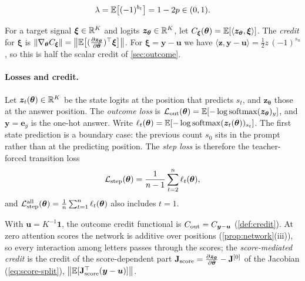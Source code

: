 \begin{definition}
\label{def:lambda}
\begin{equation}
 \lambda=\mathbb E\bigl[(-1)^{b_t}\bigr]=1-2p\in(0,1).
 \label{eq:lambda}
\end{equation}
\end{definition}

\begin{definition}[Credit]
\label{def:credit}
For a target signal $\bm\xi\in\mathbb R^K$ and logits $\bm z_{\bm\theta}\in\mathbb R^K$, let $C_{\bm\xi}(\bm\theta)=\mathbb E[\langle\bm z_{\bm\theta},\bm\xi\rangle]$.
The \emph{credit} for $\bm\xi$ is $\|\nabla_{\bm\theta}\cred_{\bm\xi}\|=\bigl\|\E\bigl[(\Jz)^\top\bm\xi\bigr]\bigr\|$.
For $\bm\xi=\bm y-\bm u$ we have $\langle\bm z,\bm y-\bm u\rangle=\frac12 z\,(-1)^{s_n}$, so this is half the scalar credit of \cref{sec:outcome}.
\end{definition}

\paragraph{Losses and credit.}

\begin{definition}
\label{def:losses}
Let $\bm z_t(\bm\theta)\in\mathbb R^K$ be the state logits at the position that predicts $s_t$, and $\bm z_{\bm\theta}$
those at the answer position. The \emph{outcome loss} is $\mathcal L_{\mathrm{out}}(\bm\theta)=\mathbb E[-\log\operatorname{softmax}(\bm z_{\bm\theta})_y]$, and $\bm y=\bm e_y$ is the one-hot answer.
Write $\ell_t(\bm\theta)=\mathbb E[-\log\operatorname{softmax}(\bm z_t(\bm\theta))_{s_t}]$. The first state prediction is a boundary case: the previous
count $s_0$ sits in the prompt rather than at the predicting position. The \emph{step loss} is therefore the teacher-forced
transition loss
\[
 \mathcal L_{\mathrm{step}}(\bm\theta)=\frac{1}{n-1}\sum_{t=2}^n\ell_t(\bm\theta),
\]
and $\Lstep^{\mathrm{all}}(\bm\theta)=\tfrac{1}{n}\sum_{t=1}^n\ell_t(\bm\theta)$ also includes $t=1$.
\end{definition}

With $\bm u=K^{-1}\bm 1$, the outcome credit functional is $C_{\mathrm{out}}=C_{\bm y-\bm u}$ (\cref{def:credit}). At zero
attention scores the network is additive over positions (\cref{prop:network}(iii)), so every interaction among letters passes through the
scores; the \emph{score-mediated credit} is the credit of the score-dependent part $\mathbf J_{\mathrm{score}}=\Jz-\mathbf J^{[0]}$ of the Jacobian (\cref{eq:score-split}),
$\bigl\|\mathbb E[\mathbf J_{\mathrm{score}}^\top(\bm y-\bm u)]\bigr\|$.

